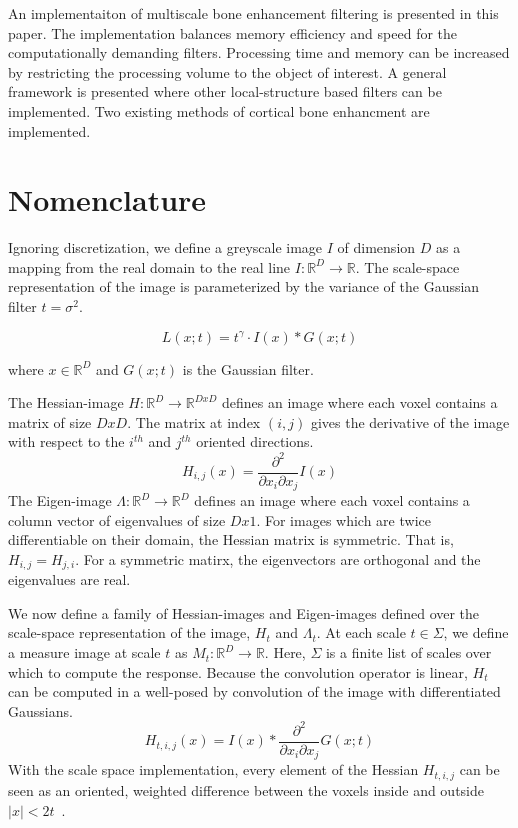 \documentclass{InsightArticle}
\begin{document}
An implementaiton of multiscale bone enhancement filtering is presented in this paper.
The implementation balances memory efficiency and speed for the computationally demanding filters.
Processing time and memory can be increased by restricting the processing volume to the object of interest.
A general framework is presented where other local-structure based filters can be implemented.
Two existing methods of cortical bone enhancment are implemented.

\newpage
\section{Nomenclature}
\label{sec:nomenclature}
Ignoring discretization, we define a greyscale image $I$ of dimension $D$ as a mapping from the real domain to the real line $I: \mathbb{R}^D \rightarrow \mathbb{R}$.
The scale-space representation of the image is parameterized by the variance of the Gaussian filter $t = \sigma^2$.

\begin{equation}
  L\left(x; t\right) = t^\gamma \cdot I\left(x\right) * G\left(x; t\right)
  \label{eqn:scale_space}
\end{equation}

where $x \in \mathbb{R}^D$ and $G\left(x; t\right)$ is the Gaussian filter.

The Hessian-image $H: \mathbb{R}^D \rightarrow \mathbb{R}^{DxD}$ defines an image where each voxel contains a matrix of size $ D x D$.
The matrix at index $(i,j)$ gives the derivative of the image with respect to the $i^{th}$ and $j^{th}$ oriented directions.
\begin{equation}
  H_{i,j}(x) = \frac{\partial^2}{\partial x_i \partial x_j} I\left(x\right)
  \label{eqn:hessian}
\end{equation}
The Eigen-image $\Lambda: \mathbb{R}^D \rightarrow \mathbb{R}^{D}$ defines an image where each voxel contains a column vector of eigenvalues of size $D x 1$.
For images which are twice differentiable on their domain, the Hessian matrix is symmetric.
That is, $H_{i,j} = H_{j,i}$.
For a symmetric matirx, the eigenvectors are orthogonal and the eigenvalues are real.

We now define a family of Hessian-images and Eigen-images defined over the scale-space representation of the image, $H_t$ and $\Lambda_t$.
At each scale $t \in \Sigma$, we define a measure image at scale $t$ as $M_t: \mathbb{R}^D \rightarrow \mathbb{R}$.
Here, $\Sigma$ is a finite list of scales over which to compute the response.
Because the convolution operator is linear, $H_t$ can be computed in a well-posed by convolution of the image with differentiated Gaussians.
\begin{equation}
  H_{t,i,j}(x) = I\left(x\right) * \frac{\partial^2}{\partial x_i \partial x_j} G\left(x; t\right)
  \label{eqn:hessian}
\end{equation}
With the scale space implementation, every element of the Hessian $H_{t,i,j}$ can be seen as an oriented, weighted difference between the voxels inside and outside $|x| < 2t$~\cite{frangi1998multiscale}.
\end{document}
